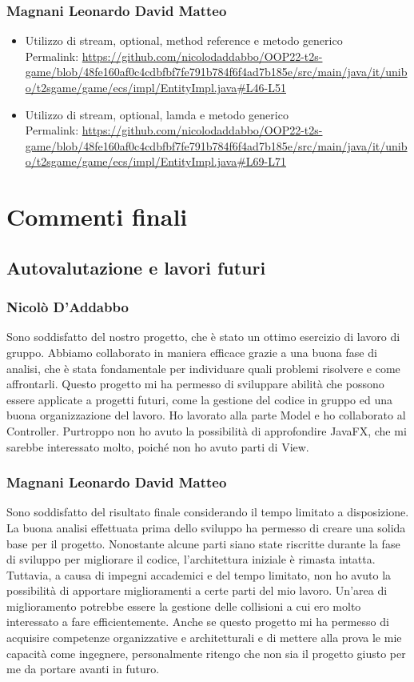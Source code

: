 \documentclass[a4paper,12pt]{report}
\begin{document}
\subsection*{Magnani Leonardo David Matteo}
\begin{itemize}
	\item Utilizzo di stream, optional, method reference e metodo generico  \\
	Permalink: \url{https://github.com/nicolodaddabbo/OOP22-t2s-game/blob/48fe160af0c4cdbfbf7fe791b784f6f4ad7b185e/src/main/java/it/unibo/t2sgame/game/ecs/impl/EntityImpl.java#L46-L51}
	\item Utilizzo di stream, optional, lamda e metodo generico \\
	Permalink: \url{https://github.com/nicolodaddabbo/OOP22-t2s-game/blob/48fe160af0c4cdbfbf7fe791b784f6f4ad7b185e/src/main/java/it/unibo/t2sgame/game/ecs/impl/EntityImpl.java#L69-L71}
\end{itemize}

\chapter{Commenti finali}

\section{Autovalutazione e lavori futuri}
\subsection*{Nicolò D'Addabbo}
Sono soddisfatto del nostro progetto, che è stato un ottimo esercizio di lavoro di gruppo. Abbiamo collaborato in maniera efficace grazie a una buona fase di analisi, che è stata fondamentale per individuare quali problemi risolvere e come affrontarli. Questo progetto mi ha permesso di sviluppare abilità che possono essere applicate a progetti futuri, come la gestione del codice in gruppo ed una buona organizzazione del lavoro.
Ho lavorato alla parte Model e ho collaborato al Controller. Purtroppo non ho avuto la possibilità di approfondire JavaFX, che mi sarebbe interessato molto, poiché non ho avuto parti di View.

\subsection*{Magnani Leonardo David Matteo}
Sono soddisfatto del risultato finale considerando il tempo limitato a disposizione. 
La buona analisi effettuata prima dello sviluppo ha permesso di creare una solida base per il progetto. 
Nonostante alcune parti siano state riscritte durante la fase di sviluppo per migliorare il codice, l'architettura iniziale è rimasta intatta. 
Tuttavia, a causa di impegni accademici e del tempo limitato, non ho avuto la possibilità di apportare miglioramenti a certe parti del mio lavoro. 
Un'area di miglioramento potrebbe essere la gestione delle collisioni a cui ero molto interessato a fare efficientemente.
Anche se questo progetto mi ha permesso di acquisire competenze organizzative e architetturali e di mettere alla prova le mie capacità come ingegnere, 
personalmente ritengo che non sia il progetto giusto per me da portare avanti in futuro.
\end{document}
